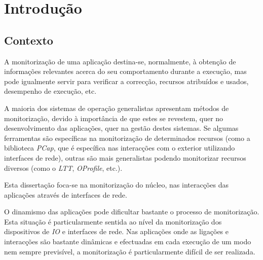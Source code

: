 \chapter{Introdução}\label{cap:introducao}

\section{Contexto}
\label{sec:intro_context}
A monitorização de uma aplicação destina-se, normalmente, à obtenção de informações relevantes acerca do seu comportamento durante a execução, mas pode igualmente servir para verificar a correcção, recursos atribuídos e usados, desempenho de execução, etc.

A maioria dos sistemas de operação generalistas apresentam métodos de monitorização, devido à importância de que estes se revestem, quer no desenvolvimento das aplicações, quer na gestão destes sistemas.
Se algumas ferramentas são específicas na monitorização de determinados recursos (como a biblioteca \textit{PCap}, que é específica nas interacções com o exterior utilizando interfaces de rede), outras são mais generalistas podendo monitorizar recursos diversos (como o \textit{LTT}, \textit{OProfile}, etc.).

Esta dissertação foca-se na monitorização do núcleo, nas interacções das aplicações através de interfaces de rede.

O dinamismo das aplicações pode dificultar bastante o processo de monitorização.
Esta situação é particularmente sentida ao nível da monitorização dos dispositivos de \textit{IO} e interfaces de rede.
Nas aplicações onde as ligações e interacções são bastante dinâmicas e efectuadas em cada execução de um modo nem sempre previsível, a monitorização é particularmente difícil de ser realizada.

